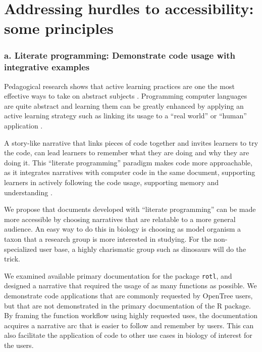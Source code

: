 \documentclass[12pt]{article}
\begin{document}
\section*{Addressing hurdles to accessibility: some principles}
\label{sec:addressing}

\subsubsection*{a. Literate programming: Demonstrate code usage with integrative examples}

Pedagogical research shows that active learning practices are one the most effective
ways to take on abstract subjects \citep{freeman2014active}.
Programming computer languages are quite abstract and learning them can be greatly
enhanced by applying an active learning strategy such as linking its usage to
a ``real world'' or ``human'' application \citep{felder2009active}.

A story-like narrative that links pieces of code together and invites learners
to try the code, can lead learners to remember what they are doing and
why they are doing it.
This ``literate programming'' paradigm \citep{knuth1984literate, fritzson2002mathmodelica}
makes code more approachable, as it integrates narratives with computer code in
the same document, supporting learners in actively following
the code usage, supporting memory and understanding \citep{piccolo2016tools}.

We propose that documents developed with ``literate programming'' can be made more
accessible by choosing narratives that are relatable to a more general audience.
An easy way to do this in biology is choosing as model organism a taxon that a
research group is more interested in studying. For the non-specialized user base,
a highly charismatic group such as dinosaurs will do the trick.


We examined available primary documentation for the package \texttt{rotl},
and designed a narrative that required the usage of as many functions as possible.
We demonstrate code applications that are commonly requested by OpenTree users,
but that are not demonstrated in the primary documentation of the R package.
By framing the function workflow using highly requested uses, the documentation acquires a
narrative arc that is easier to follow and remember by users. This can also facilitate
the application of code to other use cases in biology of interest for the users.
\end{document}
